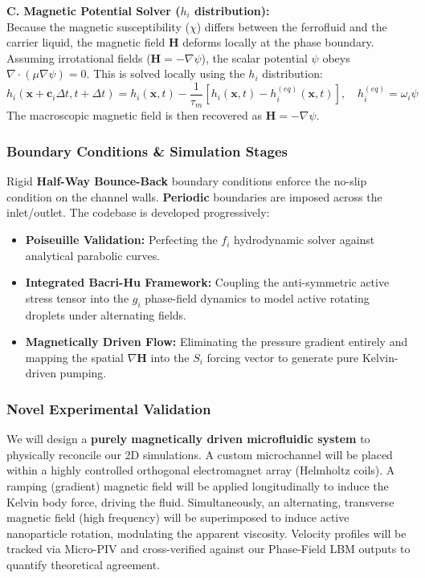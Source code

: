 \documentclass[11pt, a4paper]{article}
\begin{document}
\textbf{C. Magnetic Potential Solver ($h_i$ distribution):}\\
Because the magnetic susceptibility ($\chi$) differs between the ferrofluid and the carrier liquid, the magnetic field $\mathbf{H}$ deforms locally at the phase boundary. Assuming irrotational fields ($\mathbf{H} = -\nabla\psi$), the scalar potential $\psi$ obeys $\nabla \cdot (\mu\nabla\psi) = 0$. This is solved locally using the $h_i$ distribution:
\begin{equation}
    h_i(\mathbf{x} + \mathbf{c}_i \Delta t, t + \Delta t) = h_i(\mathbf{x}, t) - \frac{1}{\tau_m} [h_i(\mathbf{x}, t) - h_i^{(eq)}(\mathbf{x}, t)], \quad h_i^{(eq)} = \omega_i \psi
\end{equation}
The macroscopic magnetic field is then recovered as $\mathbf{H} = -\nabla\psi$.

\subsubsection{Boundary Conditions \& Simulation Stages}
Rigid \textbf{Half-Way Bounce-Back} boundary conditions enforce the no-slip condition on the channel walls. \textbf{Periodic} boundaries are imposed across the inlet/outlet. The codebase is developed progressively:
\begin{itemize}
    \item \textbf{Poiseuille Validation:} Perfecting the $f_i$ hydrodynamic solver against analytical parabolic curves.
    \item \textbf{Integrated Bacri-Hu Framework:} Coupling the anti-symmetric active stress tensor into the $g_i$ phase-field dynamics to model active rotating droplets under alternating fields.
    \item \textbf{Magnetically Driven Flow:} Eliminating the pressure gradient entirely and mapping the spatial $\nabla \mathbf{H}$ into the $S_i$ forcing vector to generate pure Kelvin-driven pumping.
\end{itemize}

\subsubsection{Novel Experimental Validation}
We will design a \textbf{purely magnetically driven microfluidic system} to physically reconcile our 2D simulations. A custom microchannel will be placed within a highly controlled orthogonal electromagnet array (Helmholtz coils). A ramping (gradient) magnetic field will be applied longitudinally to induce the Kelvin body force, driving the fluid. Simultaneously, an alternating, transverse magnetic field (high frequency) will be superimposed to induce active nanoparticle rotation, modulating the apparent viscosity. Velocity profiles will be tracked via Micro-PIV and cross-verified against our Phase-Field LBM outputs to quantify theoretical agreement.
\end{document}
